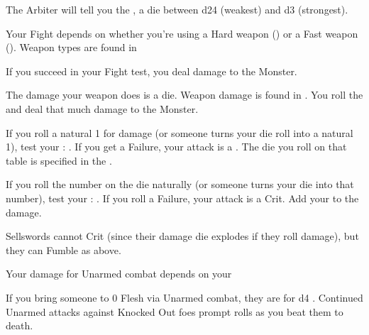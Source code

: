 {  The Arbiter will tell you the , a \STATIC die between d24 (weakest) and d3 (strongest).

  Your Fight \RO depends on whether you're using a Hard weapon (\VIG) or a Fast weapon (\DEX).  Weapon types are found in 

  If you succeed in your Fight \RO test, you deal damage to the Monster.


  The damage your weapon does is a \STATIC die.  Weapon damage is found in .  You roll the \STATIC and deal that much damage to the Monster.


  If you roll a natural 1 for damage (or someone turns your die roll into a natural 1), test your  \RS : \DEX.  If you get a Failure, your attack is a .  The die you roll on that table is specified in the .

  If you roll the \MAX number on the die naturally (or someone turns your die into that \MAX number), test your \RS : \VIG.  If you  roll a Failure, your attack is a Crit.  Add your \LVL to the damage.


  Sellswords cannot Crit (since their damage die explodes if they roll \MAX damage), but they can Fumble as above.




  Your damage for Unarmed combat depends on your \VIG


  If you bring someone to 0 Flesh via Unarmed combat, they are  for d4 .  Continued Unarmed attacks against Knocked Out foes prompt \DEATH rolls as you beat them to death.

}
